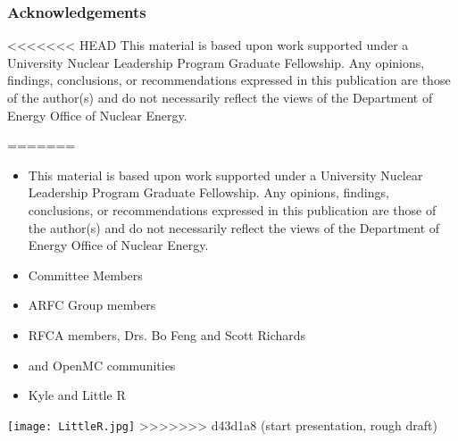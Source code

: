\begin{frame}
    \frametitle{Acknowledgements}
<<<<<<< HEAD
    This material is based upon work supported under a University 
    Nuclear Leadership Program Graduate Fellowship. Any opinions, findings, conclusions, or 
recommendations expressed in this publication are those of the author(s) 
and do not necessarily reflect the views of the Department of Energy Office 
of Nuclear Energy.

=======
    \begin{itemize}
        \item This material is based upon work supported under a University 
        Nuclear Leadership Program Graduate Fellowship. Any opinions, findings, conclusions, or 
    recommendations expressed in this publication are those of the author(s) 
    and do not necessarily reflect the views of the Department of Energy Office 
    of Nuclear Energy.
        \item Committee Members
        \item ARFC Group members
        \item RFCA members, Drs. Bo Feng and Scott Richards
        \item \Cyclus and OpenMC communities
        \item Kyle and Little R
    \end{itemize}
\end{frame}

\begin{frame}
    \centering
    \texttt{[image: LittleR.jpg]}
>>>>>>> d43d1a8 (start presentation, rough draft)
\end{frame}